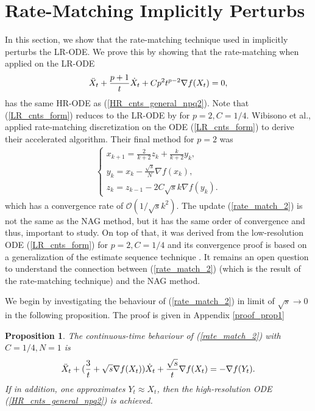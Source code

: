 \documentclass{article}
\theoremstyle{plain}
\newtheorem{proposition}[theorem]{Proposition}
\theoremstyle{definition}
\theoremstyle{remark}
\begin{document}
\section{Rate-Matching Implicitly Perturbs}
In this section, we show that the rate-matching technique used in \cite{WibisonoE7351} implicitly perturbs the LR-ODE. We prove this by showing that the rate-matching when applied on the LR-ODE 
\begin{align}\label{LR_cnts_form}
        \Ddot{X}_t+ \frac{p+1}{t}\dot{X}_t+Cp^2t^{p-2}\nabla f(X_t)=0,
\end{align}
has the same HR-ODE as (\ref{HR_cnts_general_npq2}). Note that (\ref{LR_cnts_form}) reduces to the LR-ODE by \citep{JMLR:v17:15-084} for \(p=2,C=1/4\).
 Wibisono et al., applied rate-matching discretization on the ODE (\ref{LR_cnts_form}) to derive their accelerated algorithm. Their final method for \(p=2\) was 
\begin{align}\label{rate_match_2}
    \left\{\begin{array}{l}
    x_{k+1}=\frac{2}{k+2}z_k+\frac{k}{k+2}y_k,\\
    y_{k}=x_k-\frac{\sqrt{s}}{N}\nabla f(x_k),   \\
    z_{k}=z_{k-1} -2C\sqrt{s} k\nabla f(y_k)  .    
    \end{array}\right.
\end{align}
which has a convergence rate of \(\mathcal{O}(1/\sqrt{s} k^2)\). The update (\ref{rate_match_2}) is not the same as the NAG method, but it has the same order of convergence and thus, important to study. On top of that, it was derived from the low-resolution ODE (\ref{LR_cnts_form}) for \(p=2,C=1/4\) and its convergence proof is based on a generalization of the estimate sequence technique \citep{baes2009estimate}. It remains an open question to understand the connection between (\ref{rate_match_2}) (which is the result of the rate-matching technique) and the NAG method. \par
 We begin by investigating the behaviour of (\ref{rate_match_2}) in limit of \(\sqrt{s} \rightarrow 0\) in the following proposition. The proof is given in Appendix \ref{proof_prop1}
\begin{proposition}\label{prop1}
The continuous-time behaviour of (\ref{rate_match_2}) with \(C=1/4,N=1\) is
\begin{align}\label{cont_rate_match_2}
    \Ddot{X}_t+(\frac{3}{t}+\sqrt{s}\nabla f(X_t))\dot X_t+\frac{\sqrt{s}}{t}\nabla f(X_t)=-\nabla f(Y_t).
\end{align}
If in addition, one approximates \(Y_t\approx X_t\), then the high-resolution ODE (\ref{HR_cnts_general_npq2}) is achieved.
\end{proposition}
\end{document}
